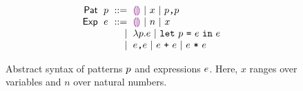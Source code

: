 \begin{figure}
  \vspace{-3px}
  \[
  \arraycolsep=3pt\begin{array}{rlrl}
      \mathsf{Pat} & \spat & ::= &
        \shole ~\vert~
        \svar{x} ~\vert~
        \sprod{\spat}{\spat}\\
      \mathsf{Exp} & \sexp & ::= &
        \shole ~\vert~
        \snumlit{n} ~\vert~
        \svar{x} \\
      & & \vert &
        \slam{\spat}{\sexp} ~\vert~
        \slet{\spat}{\sexp}{\sexp}\\
      & & \vert &
        \sprod{\sexp}{\sexp} ~\vert~
        \splus{\sexp}{\sexp} ~\vert~
        \smult{\sexp}{\sexp}
  \end{array}\]
  \caption{
    Abstract syntax of patterns $p$ and expressions $e$.
    Here,
      $x$ ranges over variables
      and $n$ over natural numbers.
  }
  \label{fig:language-syntax}
\end{figure}
